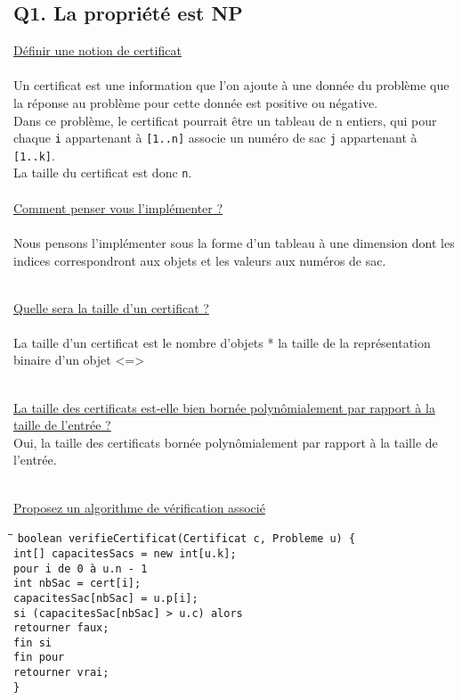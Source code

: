 \subsection*{Q1. La propriété est NP}
\underline{Définir une notion de certificat}
~\\~\\
Un certificat est une information que l'on ajoute à une donnée du problème que la réponse au problème pour cette donnée est positive ou négative.\\
Dans ce problème, le certificat pourrait être un tableau de n entiers, qui pour chaque \verb+i+ appartenant à \verb+[1..n]+ associe un numéro de sac \verb+j+ appartenant à \verb+[1..k]+.\\
La taille du certificat est donc \verb+n+.
~\\~\\
\underline{Comment penser vous l'implémenter ?}
~\\~\\
Nous pensons l'implémenter sous la forme d'un tableau à une dimension dont les indices correspondront aux objets et les valeurs aux numéros de sac.

~\\
\underline{Quelle sera la taille d'un certificat ?}
~\\~\\
La taille d'un certificat est le nombre d'objets * la taille de la représentation binaire d'un objet <=> 

~\\
\underline{La taille des certificats est-elle bien bornée polynômialement par rapport à la taille de l'entrée ?}
~\\
Oui, la taille des certificats bornée polynômialement par rapport à la taille de l'entrée.

~\\
\underline{Proposez un algorithme de vérification associé}
\begin{tabbing}
	\hspace{1cm}\=\hspace{1cm}\=\hspace{1cm}\=\kill
	\verb+boolean verifieCertificat(Certificat c, Probleme u) {+\\
		\>\verb+int[] capacitesSacs = new int[u.k];+\\
		\>\verb+pour i de 0 à u.n - 1+\\
			\>\>\verb+int nbSac = cert[i];+\\
			\>\>\verb+capacitesSac[nbSac] +\verb+= u.p[i];+\\
			\>\>\verb+si (capacitesSac[nbSac] > u.c) alors+\\
				\>\>\>\verb+retourner faux;+\\
			\>\>\verb+fin si+\\
		\>\verb+fin pour+\\
		\>\verb+retourner vrai;+\\
	\verb+}+
\end{tabbing}

